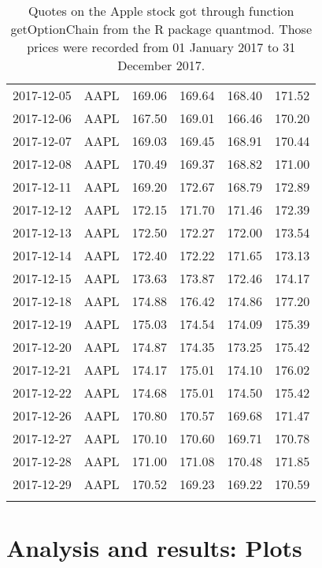 \documentclass[12pt,a4paper]{report}
\begin{document}
\begin{appendices}
\begin{longtable}{llllll}
  2017-12-05 & AAPL & 169.06 & 169.64 & 168.40 & 171.52 \\ 
  2017-12-06 & AAPL & 167.50 & 169.01 & 166.46 & 170.20 \\ 
  2017-12-07 & AAPL & 169.03 & 169.45 & 168.91 & 170.44 \\ 
  2017-12-08 & AAPL & 170.49 & 169.37 & 168.82 & 171.00 \\ 
  2017-12-11 & AAPL & 169.20 & 172.67 & 168.79 & 172.89 \\ 
  2017-12-12 & AAPL & 172.15 & 171.70 & 171.46 & 172.39 \\ 
  2017-12-13 & AAPL & 172.50 & 172.27 & 172.00 & 173.54 \\ 
  2017-12-14 & AAPL & 172.40 & 172.22 & 171.65 & 173.13 \\ 
  2017-12-15 & AAPL & 173.63 & 173.87 & 172.46 & 174.17 \\ 
  2017-12-18 & AAPL & 174.88 & 176.42 & 174.86 & 177.20 \\ 
  2017-12-19 & AAPL & 175.03 & 174.54 & 174.09 & 175.39 \\ 
  2017-12-20 & AAPL & 174.87 & 174.35 & 173.25 & 175.42 \\ 
  2017-12-21 & AAPL & 174.17 & 175.01 & 174.10 & 176.02 \\ 
  2017-12-22 & AAPL & 174.68 & 175.01 & 174.50 & 175.42 \\ 
  2017-12-26 & AAPL & 170.80 & 170.57 & 169.68 & 171.47 \\ 
  2017-12-27 & AAPL & 170.10 & 170.60 & 169.71 & 170.78 \\ 
  2017-12-28 & AAPL & 171.00 & 171.08 & 170.48 & 171.85 \\ 
  2017-12-29 & AAPL & 170.52 & 169.23 & 169.22 & 170.59 \\ 
   \hline
\caption[Market stock data (AAPL)]{Quotes on the Apple stock got through function getOptionChain from the R package quantmod. Those prices were recorded from 01 January 2017 to 31 December 2017.}
\label{t:market:stock}
\end{longtable}
\chapter{Analysis and results: Plots}
\label{cha:appendanalysis:plot}




\end{appendices}
\end{document}

